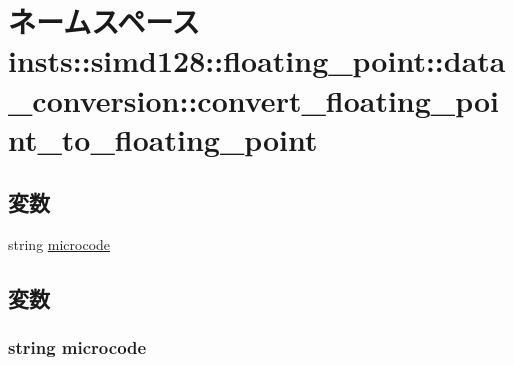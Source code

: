 \hypertarget{namespaceinsts_1_1simd128_1_1floating__point_1_1data__conversion_1_1convert__floating__point__to__floating__point}{
\section{ネームスペース insts::simd128::floating\_\-point::data\_\-conversion::convert\_\-floating\_\-point\_\-to\_\-floating\_\-point}
\label{namespaceinsts_1_1simd128_1_1floating__point_1_1data__conversion_1_1convert__floating__point__to__floating__point}
}
\subsection*{変数}
\begin{DoxyCompactItemize}
\item 
string \hyperlink{namespaceinsts_1_1simd128_1_1floating__point_1_1data__conversion_1_1convert__floating__point__to__floating__point_a770f11a173e99389a8802f0107ed8f52}{microcode}
\end{DoxyCompactItemize}


\subsection{変数}
\hypertarget{namespaceinsts_1_1simd128_1_1floating__point_1_1data__conversion_1_1convert__floating__point__to__floating__point_a770f11a173e99389a8802f0107ed8f52}{
\subsubsection[{microcode}]{\setlength{\rightskip}{0pt plus 5cm}string {\bf microcode}}}
\label{namespaceinsts_1_1simd128_1_1floating__point_1_1data__conversion_1_1convert__floating__point__to__floating__point_a770f11a173e99389a8802f0107ed8f52}
